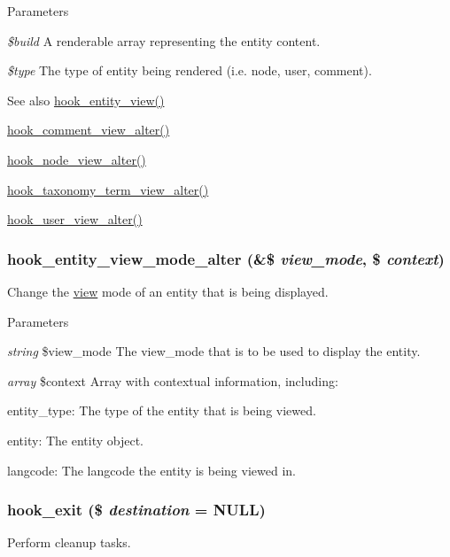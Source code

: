 \begin{DoxyParams}{Parameters}
\item[{\em \$build}]A renderable array representing the entity content. \item[{\em \$type}]The type of entity being rendered (i.e. node, user, comment).\end{DoxyParams}
\begin{DoxySeeAlso}{See also}
\hyperlink{group__hooks_gae273ba271c2ef1192fe135afa9da5d49}{hook\_\-entity\_\-view()} 

\hyperlink{group__hooks_ga092d794b204b6db107a5f763ac1be659}{hook\_\-comment\_\-view\_\-alter()} 

\hyperlink{group__node__api__hooks_gad5ece824736be57bf0020af900398b94}{hook\_\-node\_\-view\_\-alter()} 

\hyperlink{group__hooks_gad02862e477fbc925f70a7f91d2916820}{hook\_\-taxonomy\_\-term\_\-view\_\-alter()} 

\hyperlink{group__hooks_ga31a81ec1419afc31ebb77a9a86afe754}{hook\_\-user\_\-view\_\-alter()} 
\end{DoxySeeAlso}
\hypertarget{group__hooks_gaca4b0e0aba85f92344ccf941684f2272}{
\subsubsection[{hook\_\-entity\_\-view\_\-mode\_\-alter}]{\setlength{\rightskip}{0pt plus 5cm}hook\_\-entity\_\-view\_\-mode\_\-alter (\&\$ {\em view\_\-mode}, \/  \$ {\em context})}}
\label{group__hooks_gaca4b0e0aba85f92344ccf941684f2272}
Change the \hyperlink{classview}{view} mode of an entity that is being displayed.


\begin{DoxyParams}{Parameters}
\item[{\em string}]\$view\_\-mode The view\_\-mode that is to be used to display the entity. \item[{\em array}]\$context Array with contextual information, including:
\begin{DoxyItemize}
\item entity\_\-type: The type of the entity that is being viewed.
\item entity: The entity object.
\item langcode: The langcode the entity is being viewed in. 
\end{DoxyItemize}\end{DoxyParams}
\hypertarget{group__hooks_gaab945bbc2e651510aee460dcc8691366}{
\subsubsection[{hook\_\-exit}]{\setlength{\rightskip}{0pt plus 5cm}hook\_\-exit (\$ {\em destination} = {\ttfamily NULL})}}
\label{group__hooks_gaab945bbc2e651510aee460dcc8691366}
Perform cleanup tasks.

